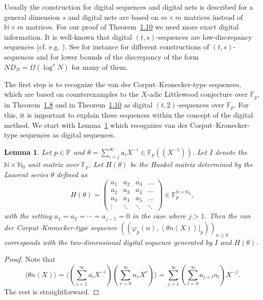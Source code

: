 \documentclass[10pt,a4paper]{amsart}
\newcommand{\NN}{\mathbb N}
\newcommand{\PP}{\mathbb P}
\newcommand{\FF}{\mathbb{F}}
\renewcommand{\(}{\left (}
\renewcommand{\)}{\right )}
\newtheorem{lemma}[theorem]{Lemma}
\theoremstyle{definition}
\numberwithin{equation}{section}
\begin{document}
Usually the construction for digital sequences and digital nets is described for a general dimension $s$ and digital nets are based on $m\times m$ matrices instead of $\NN\times m$ matrices. For our proof of Theorem~\href{https://arxiv.org/abs/2501.11362v2}{1.10} we need more exact digital information. 
It is well-known that digital $(t,s)$-sequences are low-discrepancy sequences (cf. e.g. \cite[Theorem~4.17]{niesiam}). See for instance \cite{faure,Hofer,HoNie,nie,NieYeo,sobol,NieXing} for different constructions of $(t,s)$-sequences and \cite{Levints1,Levints2} for lower bounds of the discrepancy of the form $ND_N=\Omega(\log^s N)$ for many of them.  
 


The first step is to recognize the van der Corput--Kronecker-type sequences, which are based on counterexamples to the $X$-adic Littlewood conjecture over $\FF_p$, in Theorem~\href{https://arxiv.org/abs/2501.11362v2}{1.8} and in Theorem~\href{https://arxiv.org/abs/2501.11362v2}{1.10} as digital $(t,2)$-sequences over $\FF_p$. For this, it is important to explain these sequences within the concept of the digital method. We start with Lemma~\ref{ref:identifymatrices} which recognizes van der Corput--Kronecker-type sequences as digital sequences. 

\begin{lemma}\label{ref:identifymatrices}
Let $p\in\PP$ and $\theta=\sum_{i=j}^\infty a_iX^{-i}\in\FF_p((X^{-1}))$. Let $I$ denote the $\NN\times \NN_0$ unit matrix over $\FF_p$. Let $H(\theta)$ be the \emph{Hankel matrix} determined by the Laurent series $\theta$ defined as
$$H(\theta)=\begin{pmatrix} a_1&a_2&a_3&\ldots \\
	a_2&a_3&a_4&\ldots \\
	a_3&a_4&a_5&\ldots \\
	\vdots &\ddots&\ddots&\ddots\end{pmatrix}\in\FF_p^{\NN\times \NN_0},$$
 with the setting $a_1=a_2=\cdots=a_{j-1}=0$ in the case where $j>1$. Then the van der Corput--Kronecker-type sequence $((\varphi_p(n),{\left<  \theta n(X)\right>}|_p))_{n\geq 0}$ corresponds with the two-dimensional digital sequence generated by $I$ and $H(\theta)$. 
\end{lemma}
\begin{proof}
	Note that 
	$$\langle \theta n(X)\rangle=\langle \left(\sum_{i=1}^\infty a_iX^{-i}\right) \left(\sum_{r=0}^\infty n_rX^r\right)\rangle=\sum_{j=1}^\infty\left(\sum_{l=0}^\infty a_{j+l}n_l\right)X^{-j}. $$
	The rest is straightforward.
	
\end{proof}
\end{document}
